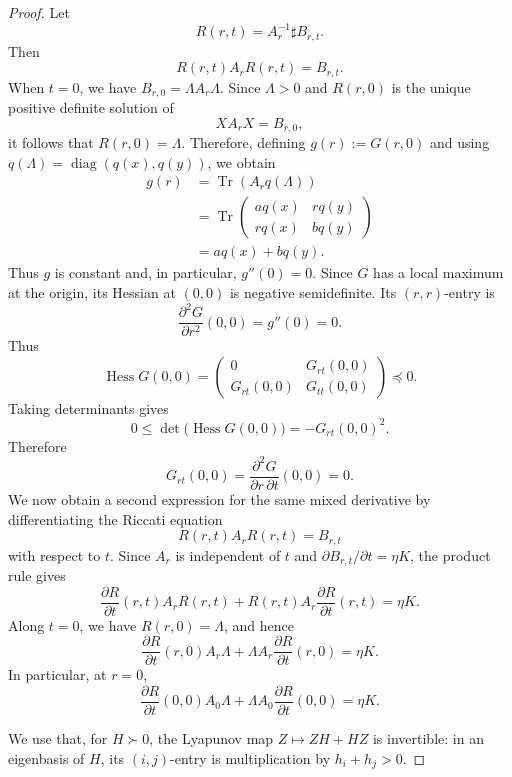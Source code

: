 \documentclass[11pt]{amsart}
\theoremstyle{definition}
\theoremstyle{remark}
\newcommand{\Tr}{\operatorname{Tr}}
\begin{document}
\begin{proof}
Let
\[
R(r,t)=A_r^{-1}\sharp B_{r,t}.
\]
Then
\[
R(r,t)A_rR(r,t)=B_{r,t}.
\]
When $t=0$, we have $B_{r,0}=\Lambda A_r\Lambda$.  Since
$\Lambda>0$ and $R(r,0)$ is the unique positive definite solution of
\[
X A_r X=B_{r,0},
\]
it follows that $R(r,0)=\Lambda$.  Therefore, defining
$g(r):=G(r,0)$ and using
$q(\Lambda)=\operatorname{diag}(q(x),q(y))$, we obtain
\[
\begin{aligned}
	g(r)
	&=\Tr\!\left(A_rq(\Lambda)\right)\\
	&=\Tr\!\begin{pmatrix}
		a q(x)&r q(y)\\
		r q(x)&b q(y)
	\end{pmatrix}\\
	&=a q(x)+b q(y).
\end{aligned}
\]
Thus $g$ is constant and, in particular, $g''(0)=0$.  Since $G$
has a local maximum at the origin, its Hessian at $(0,0)$ is negative
semidefinite.  Its $(r,r)$-entry is
\[
\frac{\partial^2G}{\partial r^2}(0,0)=g''(0)=0.
\]
Thus
\[
\operatorname{Hess}G(0,0)
=
\begin{pmatrix}
	0&G_{rt}(0,0)\\
	G_{rt}(0,0)&G_{tt}(0,0)
\end{pmatrix}
\preceq0.
\]
Taking determinants gives
\[
0\le\det\!\bigl(\operatorname{Hess}G(0,0)\bigr)
=-G_{rt}(0,0)^2.
\]
Therefore
\begin{equation}\label{eq:mixed-pinching-zero}
	G_{rt}(0,0)
	=\frac{\partial^2G}{\partial r\,\partial t}(0,0)=0.
\end{equation}
We now obtain a second expression for the same mixed derivative by
differentiating the Riccati equation
\[
R(r,t)A_rR(r,t)=B_{r,t}
\]
with respect to $t$. Since $A_r$ is independent of $t$ and
$\partial B_{r,t}/\partial t=\eta K$, the product rule gives
\[
\frac{\partial R}{\partial t}(r,t)A_rR(r,t)
+R(r,t)A_r\frac{\partial R}{\partial t}(r,t)
=\eta K.
\]
Along $t=0$, we have $R(r,0)=\Lambda$, and hence
\[
\frac{\partial R}{\partial t}(r,0)A_r\Lambda
+\Lambda A_r\frac{\partial R}{\partial t}(r,0)
=\eta K.
\]
In particular, at $r=0$,
\[
\frac{\partial R}{\partial t}(0,0)A_0\Lambda
+\Lambda A_0\frac{\partial R}{\partial t}(0,0)
=\eta K.
\]

We use that, for $H\succ0$, the Lyapunov map
$Z\mapsto ZH+HZ$ is invertible: in an eigenbasis of $H$, its
$(i,j)$-entry is multiplication by $h_i+h_j>0$.


\end{proof}
\end{document}
